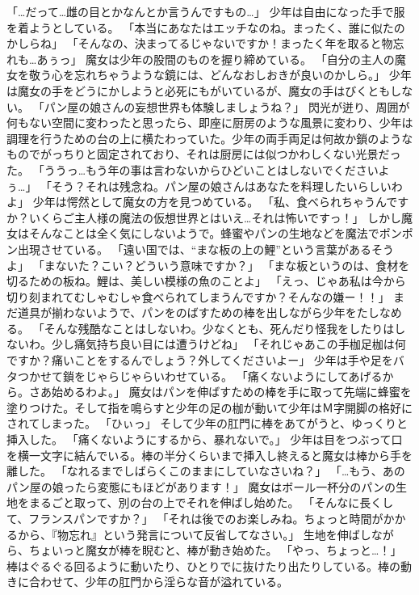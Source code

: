 「…だって…雌の目とかなんとか言うんですもの…」
少年は自由になった手で服を着ようとしている。
「本当にあなたはエッチなのね。まったく、誰に似たのかしらね」
「そんなの、決まってるじゃないですか！まったく年を取ると物忘れも…あぅっ」
魔女は少年の股間のものを握り締めている。
「自分の主人の魔女を敬う心を忘れちゃうような鏡には、どんなおしおきが良いのかしら。」
少年は魔女の手をどうにかしようと必死にもがいているが、魔女の手はびくともしない。
「パン屋の娘さんの妄想世界も体験しましょうね？」
閃光が迸り、周囲が何もない空間に変わったと思ったら、即座に厨房のような風景に変わり、少年は調理を行うための台の上に横たわっていた。少年の両手両足は何故か鎖のようなものでがっちりと固定されており、それは厨房には似つかわしくない光景だった。
「ううっ…もう年の事は言わないからひどいことはしないでくださいよぅ…」
「そう？それは残念ね。パン屋の娘さんはあなたを料理したいらしいわよ」
少年は愕然として魔女の方を見つめている。
「私、食べられちゃうんですか？いくらご主人様の魔法の仮想世界とはいえ…それは怖いですっ！」
しかし魔女はそんなことは全く気にしないようで。蜂蜜やパンの生地などを魔法でポンポン出現させている。
「遠い国では、“まな板の上の鯉”という言葉があるそうよ」
「まないた？こい？どういう意味ですか？」
「まな板というのは、食材を切るための板ね。鯉は、美しい模様の魚のことよ」
「えっ、じゃあ私は今から切り刻まれてむしゃむしゃ食べられてしまうんですか？そんなの嫌ー！！」
まだ道具が揃わないようで、パンをのばすための棒を出しながら少年をたしなめる。
「そんな残酷なことはしないわ。少なくとも、死んだり怪我をしたりはしないわ。少し痛気持ち良い目には遭うけどね」
「それじゃあこの手枷足枷は何ですか？痛いことをするんでしょう？外してくださいよー」
少年は手や足をバタつかせて鎖をじゃらじゃらいわせている。
「痛くないようにしてあげるから。さあ始めるわよ。」
魔女はパンを伸ばすための棒を手に取って先端に蜂蜜を塗りつけた。そして指を鳴らすと少年の足の枷が動いて少年はＭ字開脚の格好にされてしまった。
「ひぃっ」
そして少年の肛門に棒をあてがうと、ゆっくりと挿入した。
「痛くないようにするから、暴れないで。」
少年は目をつぶって口を横一文字に結んでいる。棒の半分くらいまで挿入し終えると魔女は棒から手を離した。
「なれるまでしばらくこのままにしていなさいね？」
「…もう、あのパン屋の娘ったら変態にもほどがあります！」
魔女はボール一杯分のパンの生地をまるごと取って、別の台の上でそれを伸ばし始めた。
「そんなに長くして、フランスパンですか？」
「それは後でのお楽しみね。ちょっと時間がかかるから、『物忘れ』という発言について反省してなさい。」
生地を伸ばしながら、ちょいっと魔女が棒を睨むと、棒が動き始めた。
「やっ、ちょっと…！」
棒はぐるぐる回るように動いたり、ひとりでに抜けたり出たりしている。棒の動きに合わせて、少年の肛門から淫らな音が溢れている。
